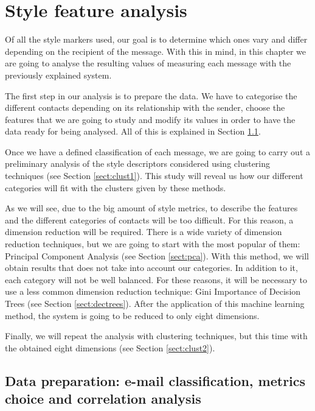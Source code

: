 \chapter{Style feature analysis}


Of all the style markers used, our goal is to determine which ones vary and differ depending on the recipient of the message. With this in mind, in this chapter we are going to analyse the resulting values of measuring each message with the previously explained system.

The first step in our analysis is to prepare the data. We have to categorise the different contacts depending on its relationship with the sender, choose the features that we are going to study and modify its values in order to have the data ready for being analysed. All of this is explained in Section \ref{sect:DatPrep}.

Once we have a defined classification of each message, we are going to carry out a preliminary analysis of the style descriptors considered using clustering techniques (see Section \ref{sect:clust1}). This study will reveal us how our different categories will fit with the clusters given by these methods.

As we will see, due to the big amount of style metrics, to describe the features and the different categories of contacts will be too difficult. For this reason, a dimension reduction will be required. There is a wide variety of dimension reduction techniques, but we are going to start with the most popular of them: Principal Component Analysis (see Section \ref{sect:pca}). With this method, we will obtain results that does not take into account our categories. In addition to it, each category will not be well balanced. For these reasons, it will be necessary to use a less common dimension reduction technique: Gini Importance of Decision Trees (see Section \ref{sect:dectrees}). After the application of this machine learning method, the system is going to be reduced to only eight dimensions.

Finally, we will repeat the analysis with clustering techniques, but this time with the obtained eight dimensions (see Section \ref{sect:clust2}).

\section{Data preparation: e-mail classification, metrics choice and correlation analysis}\label{sect:DatPrep}


